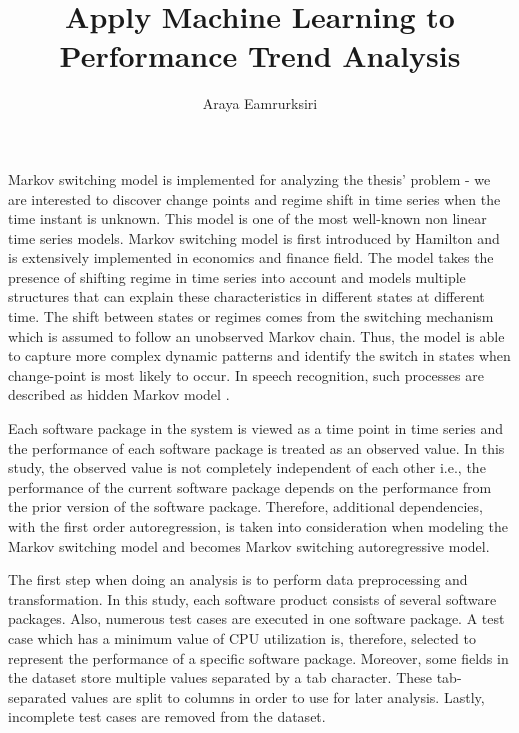 \documentclass[]{article}
\title{Apply Machine Learning to Performance Trend Analysis}
\author{Araya Eamrurksiri}
\begin{document}
\date{}
\maketitle

Markov switching model is implemented for analyzing the thesis' problem - we are interested to discover change points and regime shift in time series when the time instant is unknown. This model is one of the most well-known non linear time series models. Markov switching model is first introduced by Hamilton \cite{hamilton1989new} and is extensively implemented in economics and finance field. The model takes the presence of shifting regime in time series into account and models multiple structures that can explain these characteristics in different states at different time. The shift between states or regimes comes from the switching mechanism which is assumed to follow an unobserved Markov chain. Thus, the model is able to capture more complex dynamic patterns and identify the switch in states when change-point is most likely to occur. In speech recognition, such processes are described as hidden Markov model \cite{rabiner1989tutorial}. 

Each software package in the system is viewed as a time point in time series and the performance of each software package is treated as an observed value. In this study, the observed value is not completely independent of each other i.e., the performance of the current software package depends on the performance from the prior version of the software package. Therefore, additional dependencies, with the first order autoregression, is taken into consideration when modeling the Markov switching model and becomes Markov switching autoregressive model.

The first step when doing an analysis is to perform data preprocessing and transformation. In this study, each software product consists of several software packages. Also, numerous test cases are executed in one software package. A test case which has a minimum value of CPU utilization is, therefore, selected to represent the performance of a specific software package. Moreover, some fields in the dataset store multiple values separated by a tab character. These tab-separated values are split to columns in order to use for later analysis. Lastly, incomplete test cases are removed from the dataset.
\end{document}
